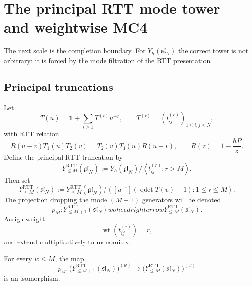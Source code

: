 \section{The principal RTT mode tower and weightwise MC4}
\label{sec:typeA-weightwise-mc4}

The next scale is the completion boundary.  For
$Y_\hbar(\mathfrak{sl}_N)$ the correct tower is not arbitrary: it is
forced by the mode filtration of the RTT presentation.

\subsection{Principal truncations}

Let
\begin{equation}
T(u)=\mathbf 1+\sum_{r\ge 1}T^{(r)}u^{-r},
\qquad T^{(r)}=(t^{(r)}_{ij})_{1\le i,j\le N},
\end{equation}
with RTT relation
\begin{equation}
R(u-v)T_1(u)T_2(v)=T_2(v)T_1(u)R(u-v),
\qquad R(z)=1-\frac{\hbar P}{z}.
\end{equation}
Define the principal RTT truncation by
\begin{equation}
Y^{\mathrm{RTT}}_{\le M}(\mathfrak{gl}_N)
:=
Y_\hbar(\mathfrak{gl}_N)\Big/\left\langle t^{(r)}_{ij}:r>M\right\rangle.
\end{equation}
Then set
\begin{equation}
Y^{\mathrm{RTT}}_{\le M}(\mathfrak{sl}_N)
:=
Y^{\mathrm{RTT}}_{\le M}(\mathfrak{gl}_N)
\Big/
\left\langle [u^{-r}](\operatorname{qdet}T(u)-1):1\le r\le M\right\rangle.
\end{equation}
The projection dropping the mode $(M+1)$ generators will be denoted
\begin{equation}
p_M:Y^{\mathrm{RTT}}_{\le M+1}(\mathfrak{sl}_N)	woheadrightarrow
Y^{\mathrm{RTT}}_{\le M}(\mathfrak{sl}_N).
\end{equation}
Assign weight
\begin{equation}
\operatorname{wt}(t^{(r)}_{ij})=r,
\end{equation}
and extend multiplicatively to monomials.

\begin{proposition}
\ClaimStatusProvedHere
\label{prop:weight-stability-algebra-tower}
For every $w\le M$, the map
\begin{equation}
\label{eq:weight-stability-algebra-map}
p_M:
\big(Y^{\mathrm{RTT}}_{\le M+1}(\mathfrak{sl}_N)\big)^{(w)}
\longrightarrow
\big(Y^{\mathrm{RTT}}_{\le M}(\mathfrak{sl}_N)\big)^{(w)}
\end{equation}
is an isomorphism.
\end{proposition}

